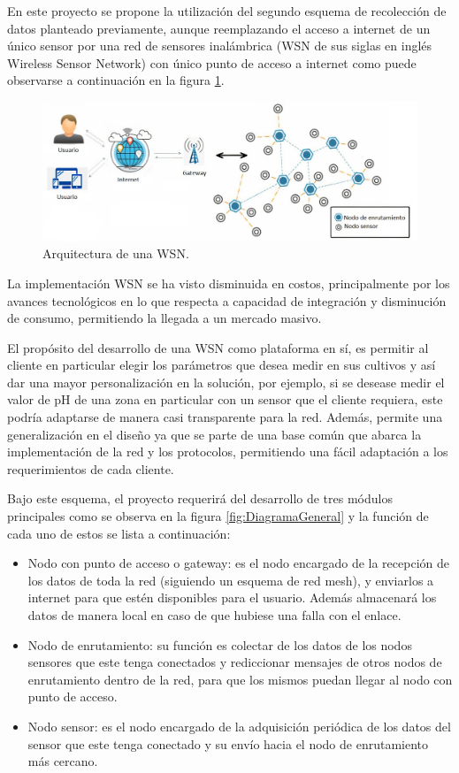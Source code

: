 \documentclass[
11pt, %
codirector, %
]{charter}
\begin{document}
En este proyecto se propone la utilización del segundo esquema de recolección de datos planteado previamente, aunque reemplazando el acceso a internet de un único sensor por una red de sensores inalámbrica (WSN de sus siglas en inglés Wireless Sensor Network) con único punto de acceso a internet como puede observarse a continuación en la figura \ref{fig:WSN_architecture}.

\begin{figure}[htpb]
\centering 
\includegraphics[width=1\textwidth]{./Figuras/WSN_architecture.jpg}
\caption{Arquitectura de una WSN.}
\label{fig:WSN_architecture}
\end{figure}

La implementación WSN se ha visto disminuida en costos, principalmente por los avances tecnológicos en lo que respecta a capacidad de integración y disminución de consumo, permitiendo la llegada a un mercado masivo.

El propósito del desarrollo de una WSN como plataforma en sí, es permitir al cliente en particular elegir los parámetros que desea medir en sus cultivos y así dar una mayor personalización en la solución, por ejemplo, si se desease medir el valor de pH de una zona en particular con un sensor que el cliente requiera, este podría adaptarse de manera casi transparente para la red. Además, permite una generalización en el diseño ya que se parte de una base común que abarca la implementación de la red y los protocolos, permitiendo una fácil adaptación a los requerimientos de cada cliente.

Bajo este esquema, el proyecto requerirá del desarrollo de tres módulos principales como se observa en la figura \ref{fig:DiagramaGeneral} y la función de cada uno de estos se lista a continuación:

\begin{itemize}
\item Nodo con punto de acceso o gateway: es el nodo encargado de la recepción de los datos de toda la red (siguiendo un esquema de red mesh), y enviarlos a internet para que estén disponibles para el usuario. Además almacenará los datos de manera local en caso de que hubiese una falla con el enlace.
\item Nodo de enrutamiento: su función es colectar de los datos de los nodos sensores que este tenga conectados y rediccionar mensajes de otros nodos de enrutamiento dentro de la red, para que los mismos puedan llegar al nodo con punto de acceso.
\item Nodo sensor: es el nodo encargado de la adquisición periódica de los datos del sensor que este tenga conectado y su envío hacia el nodo de enrutamiento más cercano.
\end{itemize}
\end{document}
